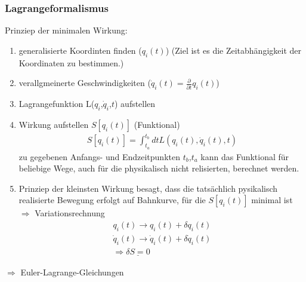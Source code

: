 \documentclass[a4paper]{article}
\begin{document}
\subsubsection{Lagrangeformalismus}
Prinziep der minimalen Wirkung:
\begin{enumerate}
  \item generalisierte Koordinten finden ($q_i(t)$) (Ziel ist es die
  Zeitabhängigkeit der Koordinaten zu bestimmen.)
  \item verallgmeinerte Geschwindigkeiten
  ($\dot{q}_i(t)=\frac{\partial}{\partial t}q_i(t)$)
  \item Lagrangefunktion L($q_i$,$\dot{q}_i$,$t$) aufstellen
  \item Wirkung aufstellen $S[q_i(t)]$ (Funktional)
  \begin{align}
  S[q_i(t)]=\int_{t_a}^{t_b} dt L(q_i(t),\dot{q}_i(t),t)
  \end{align}
  zu gegebenen Anfangs- und Endzeitpunkten $t_b$,$t_a$ kann das Funktional für
  beliebige Wege, auch für die physikalisch nicht relisierten, berechnet werden.
  \item Prinziep der kleinsten Wirkung besagt, dass die tatsächlich pysikalisch 
  realisierte Bewegung erfolgt auf Bahnkurve, für die $S[q_i(t)]$ minimal ist
  $\Rightarrow$ Variationsrechnung 
  \begin{align}
  q_i(t)\rightarrow q_i(t)+\delta q_i(t)\\
  \dot{q}_i(t)\rightarrow \dot{q}_i(t)+\delta \dot{q}_i(t)\\
  \Rightarrow \underline{\delta S = 0}
  \end{align} 
\end{enumerate}
$\Rightarrow$ Euler-Lagrange-Gleichungen
\end{document}

